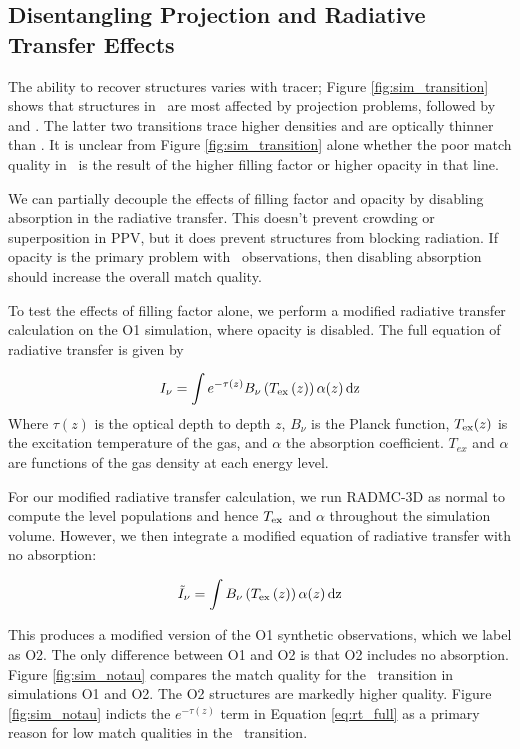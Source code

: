 \subsection{Disentangling Projection and Radiative Transfer Effects}
The ability to recover structures varies with tracer; Figure \ref{fig:sim_transition} shows that structures in \coa\,
are most affected by projection problems, followed by \cob\, and \coc. The latter two transitions trace higher densities
and are optically thinner than \coa. It is unclear from Figure \ref{fig:sim_transition} alone whether the poor match quality in \coa\, is the result of the higher filling factor
or higher opacity in that line.

We can partially decouple the effects of filling factor and opacity by disabling absorption in the radiative transfer. This doesn't prevent crowding or superposition in PPV, but it does prevent structures from blocking radiation. If opacity is the primary problem
with \coa\, observations, then disabling absorption should increase the overall match quality.

To test the effects of filling factor alone, we perform a modified radiative transfer calculation on the O1 simulation, where opacity is disabled. The full
equation of radiative transfer is given by

\begin{equation}
I_\nu = \int e^{-\tau(z)} B_\nu\left(T_{\rm ex}\left(z\right)\right) \alpha(z)\, \rm dz
\label{eq:rt_full}
\end{equation}
Where $\tau(z)$ is the optical depth to depth $z$, $B_\nu$ is the Planck function, $T_{\rm ex}(z)$ is the excitation
temperature of the gas, and $\alpha$ the absorption coefficient.  $T_{ex}$ and $\alpha$ are functions of the gas density at each energy level.

For our modified radiative transfer calculation, we run RADMC-3D as normal to compute the level populations and hence $T_{\rm ex}$ and $\alpha$
throughout the simulation volume. However, we then integrate a modified equation of radiative transfer with no absorption:

\begin{equation}
\tilde{I}_\nu = \int B_\nu\left(T_{\rm ex}\left(z\right)\right) \alpha(z)\, \rm dz
\end{equation}

This produces a modified version of the O1 synthetic observations, which we label as O2. The only difference between O1 and O2 is that O2 includes no absorption. Figure \ref{fig:sim_notau} compares
the match quality for the \coa\, transition in simulations O1 and O2. The O2 structures are markedly higher quality. Figure \ref{fig:sim_notau} indicts the $e^{-\tau(z)}$ term in Equation \ref{eq:rt_full} as a primary reason for low match qualities in the \coa\, transition.


